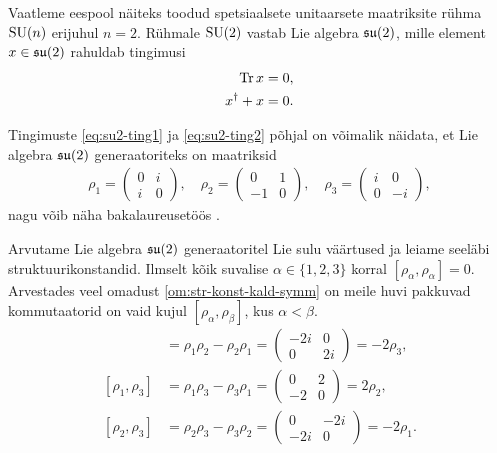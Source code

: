 \begin{naide}
    Vaatleme eespool näiteks toodud spetsiaalsete unitaarsete maatriksite
    rühma $\operatorname{SU}(n)$ erijuhul $n = 2$. Rühmale $\operatorname{SU}(2)$ vastab Lie algebra
    $\mathfrak{su}(2)$, mille
    element $x \in \mathfrak{su}(2)$ rahuldab tingimusi
    \begin{align}
        \operatorname{Tr} x = 0,\label{eq:su2-ting1} \\
        x^\dag + x = 0.\label{eq:su2-ting2}
    \end{align}

    Tingimuste \eqref{eq:su2-ting1} ja \eqref{eq:su2-ting2} põhjal
    on võimalik näidata, et Lie algebra $\mathfrak{su}(2)$ generaatoriteks
    on maatriksid
    \begin{align*}
        \rho_1 = \begin{pmatrix}
            0 & i \\
            i & 0
        \end{pmatrix},
        \quad
        \rho_2 = \begin{pmatrix}
            0 & 1 \\
            -1 & 0
        \end{pmatrix},
        \quad
        \rho_3 = \begin{pmatrix}
            i & 0 \\
            0 & -i
        \end{pmatrix},
    \end{align*}
    nagu võib näha bakalaureusetöös \cite{latt2013}.

    Arvutame Lie algebra $\mathfrak{su}(2)$ generaatoritel Lie sulu väärtused
    ja leiame seeläbi struktuurikonstandid. Ilmselt kõik suvalise
    $\alpha \in \{1, 2, 3\}$ korral $[\rho_\alpha, \rho_\alpha] = 0$.
    Arvestades veel omadust \eqref{om:str-konst-kald-symm} on meile
    huvi pakkuvad kommutaatorid on vaid kujul
    $[\rho_\alpha, \rho_\beta]$, kus $\alpha < \beta$.
    \begin{align}
        [\rho_1, \rho_2] &= \rho_1 \rho_2 - \rho_2 \rho_1 =
            \begin{pmatrix}
                -2i &  0 \\
                  0 & 2i
            \end{pmatrix} = -2 \rho_3, \label{eq:str-konst-naide-brac-1}\\[0.1cm]
        [\rho_1, \rho_3] &= \rho_1 \rho_3 - \rho_3 \rho_1 =
            \begin{pmatrix}
                 0 & 2 \\
                -2 & 0
            \end{pmatrix} = 2 \rho_2, \label{eq:str-konst-naide-brac-2}\\[0.1cm]
        [\rho_2, \rho_3] &= \rho_2 \rho_3 - \rho_3 \rho_2 =
            \begin{pmatrix}
                  0 & -2i \\
                -2i & 0
            \end{pmatrix} = -2 \rho_1. \label{eq:str-konst-naide-brac-3}
    \end{align}


\end{naide}
